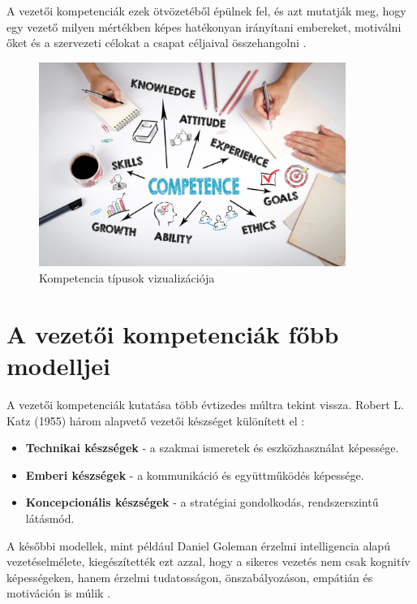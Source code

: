 A vezetői kompetenciák ezek ötvözetéből épülnek fel, és azt mutatják meg, hogy egy vezető milyen mértékben képes hatékonyan irányítani embereket, motiválni őket és a szervezeti célokat a csapat céljaival összehangolni \cite{boyatzis1982}.
\begin{figure}[H]
	\centering
    \includegraphics[width=100mm, keepaspectratio]{figures/competence.jpg}
    \caption{Kompetencia típusok vizualizációja} 
    \label {fig:competence}
\end{figure}
\section{A vezetői kompetenciák főbb modelljei}

A vezetői kompetenciák kutatása több évtizedes múltra tekint vissza. 
Robert L. Katz (1955) három alapvető vezetői készséget különített el \cite{katz1955}:

\begin{itemize}
    \item \textbf{Technikai készségek} - a szakmai ismeretek és eszközhasználat képessége.
    \item \textbf{Emberi készségek} - a kommunikáció és együttműködés képessége.
    \item \textbf{Koncepcionális készségek} - a stratégiai gondolkodás, rendszerszintű látásmód.
\end{itemize}

A későbbi modellek, mint például Daniel Goleman érzelmi intelligencia alapú vezetéselmélete, 
kiegészítették ezt azzal, hogy a sikeres vezetés nem csak kognitív képességeken, 
hanem érzelmi tudatosságon, önszabályozáson, empátián és motiváción is múlik \cite{goleman1998}. 

